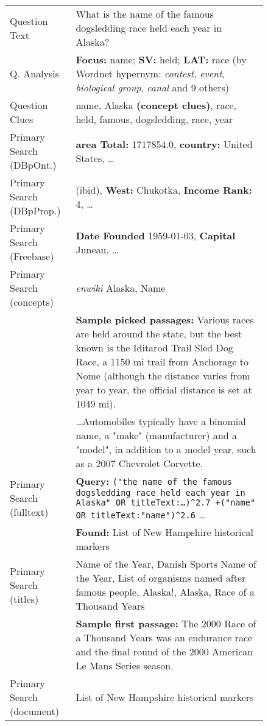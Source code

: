 \begin{figure}[t!]
\renewcommand{\arraystretch}{1.3}
\centering
\footnotesize
\begin{tabular}{|p{1.8cm}p{6cm}|}
\hline
Question Text & What is the name of the famous dogsledding race held each year in Alaska? \\
Q. Analysis & \textbf{Focus:} name; \textbf{SV:} held; \textbf{LAT:} race
	(by Wordnet hypernym: \textit{contest}, \textit{event}, \textit{biological group}, \textit{canal} and 9 others) \\
Question Clues & name, Alaska \textbf{(concept clues)}, race, held, famous, dogsledding, race, year \\ \hline

Primary Search (DBpOnt.) & \textbf{area Total:} 1717854.0, \textbf{country:} United States, \dots \\
Primary Search (DBpProp.) & (ibid), \textbf{West:} Chukotka, \textbf{Income Rank:} 4, \dots \\
Primary Search (Freebase) & \textbf{Date Founded} 1959-01-03, \textbf{Capital} Juneau, \dots \\
Primary Search (concepts) & \textit{enwiki} Alaska, Name \\
	& \textbf{Sample picked passages:} Various races are held around the state, but the best known is the Iditarod Trail Sled Dog Race, a 1150 mi trail from Anchorage to Nome (although the distance varies from year to year, the official distance is set at 1049 mi). \\
	& \dots Automobiles typically have a binomial name, a "make" (manufacturer) and a "model", in addition to a model year, such as a 2007 Chevrolet Corvette.\\
Primary Search (fulltext) & \textbf{Query:} \texttt{("the name of the famous dogsledding race held each year in Alaska" OR titleText:\dots)\^{}2.7 +("name" OR titleText:"name")\^{}2.6} \dots \\
	& \textbf{Found:} List of New Hampshire historical markers \\
Primary Search (titles) & Name of the Year, Danish Sports Name of the Year, List of organisms named after famous people, Alaska!, Alaska, Race of a Thousand Years \\
	& \textbf{Sample first passage:} The 2000 Race of a Thousand Years was an endurance race and the final round of the 2000 American Le Mans Series season. \\
Primary Search (document) & List of New Hampshire historical markers \\ \hline


\end{tabular}
\end{figure}
